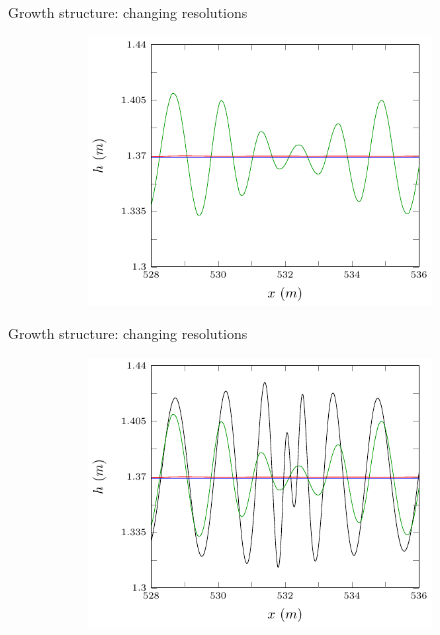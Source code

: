 \documentclass[pdf]{beamer}
\begin{document}
\begin{frame}{Growth structure: changing resolutions}
	\begin{figure}
		\begin{subfigure}{0.75\textwidth}
			\includegraphics[width=\textwidth]{../Pics/dx0/468/4-figure0.pdf}
		\end{subfigure}
	\end{figure}
\end{frame}

\begin{frame}{Growth structure: changing resolutions}
	\begin{figure}
		\begin{subfigure}{0.75\textwidth}
			\includegraphics[width=\textwidth]{../Pics/dx0/all/4-figure0.pdf}
		\end{subfigure}
	\end{figure}
\end{frame}
\end{document}
